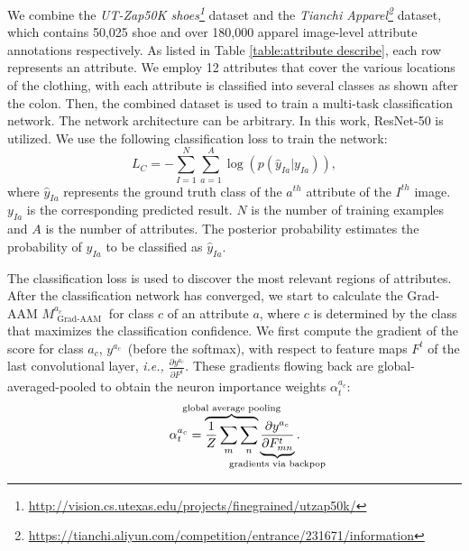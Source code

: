 \documentclass{article}
\begin{document}
We combine the \textit{UT-Zap50K shoes\footnote{\url{http://vision.cs.utexas.edu/projects/finegrained/utzap50k/}}} dataset and the \textit{Tianchi Apparel\footnote{\url{https://tianchi.aliyun.com/competition/entrance/231671/information}}} dataset, which contains 50,025 shoe and over 180,000 apparel image-level attribute annotations respectively. As listed in Table \ref{table:attribute describe}, each row represents an attribute. We employ 12 attributes that cover the various locations of the clothing, with each attribute is classified into several classes as shown after the colon. Then, the combined dataset is used to train a multi-task classification network. The network architecture can be arbitrary. In this work, ResNet-50 \cite{he2016deep} is utilized. We use the following classification loss to train the network:
\begin{equation}
     L _ { C } = - \sum _ { I = 1 } ^ { N } \sum _ { a = 1 } ^ { A } \log \left( p \left( \hat{y} _ { I a } | y _ { I a } \right) \right),\label{equation:classification} 
\end{equation}
where $\hat{y} _ { I a }$ represents the ground truth class of the $a ^ {t h}$ attribute of the $I ^ {t h}$ image. $y _ { I a }$ is the corresponding predicted result. $N$ is the number of training examples and $A$ is the number of attributes. The posterior probability estimates the probability of $y _ { I a }$ to be classified as $\hat{y} _ { I a }$.

The classification loss is used to discover the most relevant regions of attributes. After the classification network has converged, we start to calculate the Grad-AAM $M _ { \text { Grad-AAM } } ^ { a_c }$ for class $c$ of an attribute $a$, where $c$ is determined by the class that maximizes the classification confidence. We first compute the gradient of the score for class $a_c$, $y^{a_c}$~(before the softmax), with respect to feature maps $F ^ { t }$ of the last convolutional layer, \textit{i.e.,} $\frac { \partial y ^ { a_c } } { \partial F ^ { t } }$. These gradients flowing back are global-averaged-pooled to obtain the neuron importance weights $\alpha _ { t } ^ { a_c }$:
\begin{equation}
    \alpha _ { t } ^ { a_c } = \overbrace { \frac { 1 } { Z } \sum _ { m } \sum _ { n } }^{\mathclap{\text{global average pooling}}} \underbrace { \frac { \partial y ^ { a_c } } { \partial F _ { m n } ^ { t } } } _ {\mathclap{\text { gradients via backpop }}}.
\end{equation}
\end{document}
